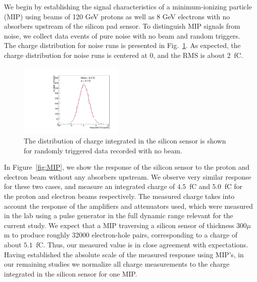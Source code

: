 \documentclass[12pt]{article}
\begin{document}
{%

We begin by establishing the signal characteristics of a minimum-ionizing
particle (MIP) using beams of 120 GeV protons as well as 8 GeV electrons with no
absorbers upstream of the silicon pad sensor. To distinguish MIP signals from
noise, we collect data events of pure noise with no beam and random triggers.
The charge distribution for noise runs is presented in
Fig.~\ref{fig:noise}. As expected, the charge distribution for noise
runs is centered at 0, and the RMS is about $2$~fC. 

\begin{figure}[htbp] 
\centering
\includegraphics[width=0.45\textwidth]{plots/NoiseNoBeam_charge.pdf} 
\caption{The distribution of charge integrated in the silicon sensor is shown for randomly triggered 
data recorded with no beam. } 
\label{fig:noise} 
\end{figure} 

In Figure~\ref{fig:MIP}, we show the response of the silicon sensor to
the proton and electron beam without any absorbers upstream. We observe very similar
response for these two cases, and measure an integrated charge of $4.5$~fC and $5.0$~fC
for the proton and electron beams respectively. The measured charge takes into account
the response of the amplifiers and attenuators used, which were measured 
in the lab using a pulse generator in the full dynamic range relevant for the current study.
We expect that a MIP traversing a silicon sensor of thickness 300$\mu$m to produce roughly 32000 
electron-hole pairs, corresponding to a charge of about $5.1$~fC. Thus, our measured value
is in close agreement with expectations. Having established the absolute scale of the measured 
response using MIP's, in our remaining studies we normalize all charge measurements to the 
charge integrated in the silicon sensor for one MIP. 

}
\end{document}
